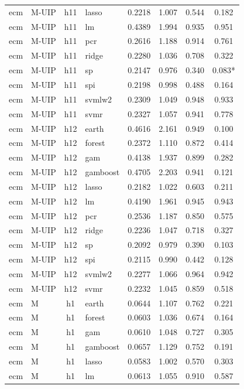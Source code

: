 \begin{ThreePartTable}
\begin{longtable}[t]{llclcccc}
ecm & M-UIP & h11 & lasso & 0.2218 & 1.007 & 0.544 & 0.182\\
ecm & M-UIP & h11 & lm & 0.4389 & 1.994 & 0.935 & 0.951\\
ecm & M-UIP & h11 & pcr & 0.2616 & 1.188 & 0.914 & 0.761\\
ecm & M-UIP & h11 & ridge & 0.2280 & 1.036 & 0.708 & 0.322\\
ecm & M-UIP & h11 & sp & 0.2147 & 0.976 & 0.340 & 0.083*\\
ecm & M-UIP & h11 & spi & 0.2198 & 0.998 & 0.488 & 0.164\\
ecm & M-UIP & h11 & svmlw2 & 0.2309 & 1.049 & 0.948 & 0.933\\
ecm & M-UIP & h11 & svmr & 0.2327 & 1.057 & 0.941 & 0.778\\
\addlinespace
ecm & M-UIP & h12 & earth & 0.4616 & 2.161 & 0.949 & 0.100\\
ecm & M-UIP & h12 & forest & 0.2372 & 1.110 & 0.872 & 0.414\\
ecm & M-UIP & h12 & gam & 0.4138 & 1.937 & 0.899 & 0.282\\
ecm & M-UIP & h12 & gamboost & 0.4705 & 2.203 & 0.941 & 0.121\\
ecm & M-UIP & h12 & lasso & 0.2182 & 1.022 & 0.603 & 0.211\\
ecm & M-UIP & h12 & lm & 0.4190 & 1.961 & 0.945 & 0.943\\
ecm & M-UIP & h12 & pcr & 0.2536 & 1.187 & 0.850 & 0.575\\
ecm & M-UIP & h12 & ridge & 0.2236 & 1.047 & 0.718 & 0.327\\
ecm & M-UIP & h12 & sp & 0.2092 & 0.979 & 0.390 & 0.103\\
ecm & M-UIP & h12 & spi & 0.2115 & 0.990 & 0.442 & 0.128\\
ecm & M-UIP & h12 & svmlw2 & 0.2277 & 1.066 & 0.964 & 0.942\\
ecm & M-UIP & h12 & svmr & 0.2232 & 1.045 & 0.859 & 0.518\\
\addlinespace
ecm & M & h1 & earth & 0.0644 & 1.107 & 0.762 & 0.221\\
ecm & M & h1 & forest & 0.0603 & 1.036 & 0.674 & 0.164\\
ecm & M & h1 & gam & 0.0610 & 1.048 & 0.727 & 0.305\\
ecm & M & h1 & gamboost & 0.0657 & 1.129 & 0.752 & 0.191\\
ecm & M & h1 & lasso & 0.0583 & 1.002 & 0.570 & 0.303\\
ecm & M & h1 & lm & 0.0613 & 1.055 & 0.910 & 0.587\\

\end{longtable}
\end{ThreePartTable}
